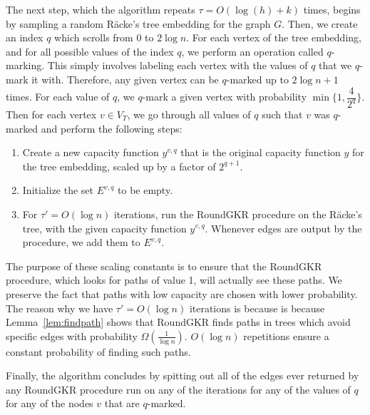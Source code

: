 \documentclass[12pt]{article}
\begin{document}
The next step, which the algorithm repeats $\tau = O(\log(h) + k)$ times, begins by sampling a random R\"{a}cke's tree embedding for the graph $G$. Then, we create an index $q$ which scrolls from 0 to $2\log n$. For each vertex of the tree embedding, and for all possible values of the index $q$, we perform an operation called $q$-marking. This simply involves labeling each vertex with the values of $q$ that we $q$-mark it with. Therefore, any given vertex can be $q$-marked up to $2\log n + 1$ times. For each value of $q$, we $q$-mark a given vertex with probability $\min\{1, \dfrac{4}{2^q}\}$. Then for each vertex $v \in V_T$, we go through all values of $q$ such that $v$ was $q$-marked and perform the following steps:
\begin{enumerate}
\item Create a new capacity function $y^{v,q}$ that is the original capacity function $y$ for the tree embedding, scaled up by a factor of $2^{q+1}$.
\item Initialize the set $E^{v,q}$ to be empty. 
\item For $\tau' = O(\log n)$ iterations, run the RoundGKR procedure on the R\"{a}cke's tree, with the given capacity function $y^{v,q}$. Whenever edges are output by the procedure, we add them to $E^{v,q}$.
\end{enumerate}

The purpose of these scaling constants is to ensure that the RoundGKR procedure, which looks for paths of value 1, will actually see these paths. We preserve the fact that paths with low capacity are chosen with lower probability. The reason why we have $\tau' = O(\log n)$ iterations is because is because  Lemma~\ref{lem:findpath} shows that RoundGKR finds paths in trees which avoid specific edges with probability $\Omega(\frac{1}{\log n})$. $O(\log n)$ repetitions ensure a constant probability of finding such paths.

Finally, the algorithm concludes by spitting out all of the edges ever returned by any RoundGKR procedure run on any of the iterations for any of the values of $q$ for any of the nodes $v$ that are $q$-marked.
%
\end{document}
